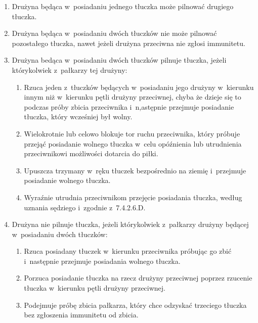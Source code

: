 \documentclass[12pt,a4paper]{article}
\begin{document}
\begin{enumerate}
	\item
	      Drużyna będąca w~posiadaniu jednego tłuczka może pilnować drugiego
	      tłuczka.
	\item
	      Drużyna będąca w~posiadaniu dwóch tłuczków nie może pilnować
	      pozostałego tłuczka, nawet jeżeli drużyna przeciwna nie zgłosi
	      immunitetu.
	\item
	      Drużyna bedąca w~posiadaniu dwóch tłuczków pilnuje tłuczka, jeżeli
	      którykolwiek z~pałkarzy tej drużyny:

	      \begin{enumerate}
		      \item
		            Rzuca jeden z~tłuczków będących w~posiadaniu jego drużyny w~kierunku
		            innym niż w~kierunku pętli drużyny przeciwnej, chyba że dzieje się
		            to podczas próby zbicia przeciwnika i~n,astępnie przejmuje posiadanie
		            tłuczka, który wcześniej był wolny.
		      \item
		            Wielokrotnie lub celowo blokuje tor ruchu przeciwnika, który próbuje
		            przejąć posiadanie wolnego tłuczka w~celu opóźnienia lub utrudnienia
		            przeciwnikowi możliwości dotarcia do piłki.
		      \item
		            Upuszcza trzymany w~ręku tłuczek bezpośrednio na ziemię i~przejmuje
		            posiadanie wolnego tłuczka.
		      \item
		            Wyraźnie utrudnia przeciwnikom przejęcie posiadania tłuczka, według
		            uznania sędziego i~zgodnie z~7.4.2.6.D.
	      \end{enumerate}
	\item
	      Drużyna nie pilnuje tłuczka, jeżeli którykolwiek z~pałkarzy drużyny
	      będącej w~posiadaniu dwóch tłuczków:

	      \begin{enumerate}
		      \item
		            Rzuca posiadany tłuczek w~kierunku przeciwnika próbując go zbić i~następnie przejmuje posiadania wolnego tłuczka.
		      \item
		            Porzuca posiadanie tłuczka na rzecz drużyny przeciwnej poprzez
		            rzucenie tłuczka w~kierunku pętli drużyny przeciwnej.
		      \item
		            Podejmuje próbę zbicia pałkarza, który chce odzyskać trzeciego
		            tłuczka bez zgłoszenia immunitetu od zbicia.
	      \end{enumerate}
\end{enumerate}
\end{document}

